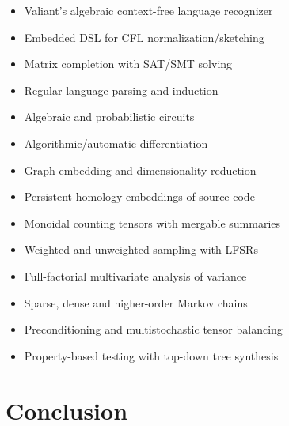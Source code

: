\documentclass[sigplan,10pt,review,anonymous]{acmart}
\begin{document}
\begin{itemize}
  \item Valiant's algebraic context-free language recognizer~\citep{valiant1975general}
  \item Embedded DSL for CFL normalization/sketching~\citep{chomsky1959algebraic}
  \item Matrix completion with SAT/SMT solving
  \item Regular language parsing and induction
  \item Algebraic and probabilistic circuits~\citep{choi2020probabilistic}
  \item Algorithmic/automatic differentiation~\citep{considine2019programming}
  \item Graph embedding and dimensionality reduction~\citep{hamilton2020graph}
  \item Persistent homology embeddings of source code
  \item Monoidal counting tensors with mergable summaries
  \item Weighted and unweighted sampling with LFSRs~\citep{klein2013linear}
  \item Full-factorial multivariate analysis of variance
  \item Sparse, dense and higher-order Markov chains
  \item Preconditioning and multistochastic tensor balancing
  \item Property-based testing with top-down tree synthesis
\end{itemize}

\section{Conclusion}

\end{document}
